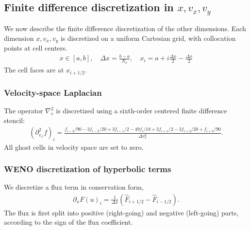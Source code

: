 \documentclass{article}
\newcommand{\Dv}{\nabla_v}
\begin{document}
\subsection{Finite difference discretization in $x, v_x, v_y$}
We now describe the finite difference discretization of the other dimensions.
Each dimension $x, v_x, v_y$ is discretized on a uniform Cartesian grid, with collocation points
at cell centers.
\begin{align*}
    x \in [a, b], \quad \Delta x = \frac{b - a}{N_x}, \quad x_i = a + i\frac{\Delta x}{2} - \frac{\Delta x}{2}
\end{align*}
The cell faces are at $x_{i+1/2}$.

\subsubsection{Velocity-space Laplacian}
The operator $\Dv^2$ is discretized using a sixth-order centered finite difference stencil:
\begin{align*}
    (\partial_{v_x}^2 f)_i = \frac{f_{i-3}/90 - 3f_{i-2}/20 + 3f_{i-1}/2 - 49f_i/18 + 3f_{i+1}/2 - 3f_{i+2}/20 + f_{i+3}/90}{\Delta v_x^2}.
\end{align*}
All ghost cells in velocity space are set to zero.

\subsubsection{WENO discretization of hyperbolic terms}
We discretize a flux term in conservation form,
\begin{align*}
    \partial_x F(u)_i = \frac{1}{\Delta x} (\hat{F}_{i+1/2} - \hat{F}_{i-1/2}).
\end{align*}
The flux is first split into positive (right-going) and negative (left-going) parts,
according to the sign of the flux coefficient.
\end{document}
